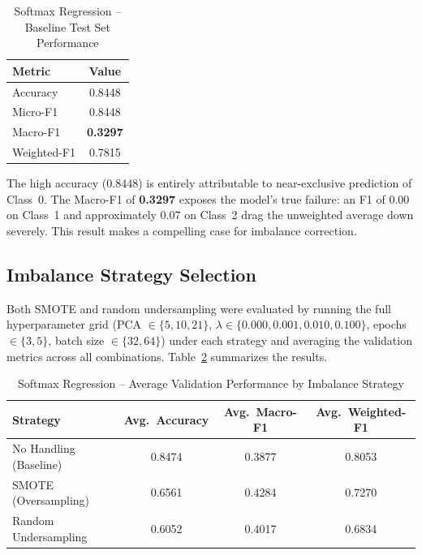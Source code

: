 \documentclass[12pt,a4paper]{article}
\begin{document}
\begin{table}[H]
    \centering
    \caption{Softmax Regression -- Baseline Test Set Performance}
    \label{tab:softmax_baseline_final}
    \begin{tabular}{lc}
        \toprule
        \textbf{Metric} & \textbf{Value} \\
        \midrule
        Accuracy    & 0.8448 \\
        Micro-F1    & 0.8448 \\
        Macro-F1    & \textbf{0.3297} \\
        Weighted-F1 & 0.7815 \\
        \bottomrule
    \end{tabular}
\end{table}

The high accuracy (0.8448) is entirely attributable to near-exclusive prediction of Class~0. The Macro-F1 of \textbf{0.3297} exposes the model's true failure: an F1 of 0.00 on Class~1 and approximately 0.07 on Class~2 drag the unweighted average down severely. This result makes a compelling case for imbalance correction.

\subsection{Imbalance Strategy Selection}

Both SMOTE and random undersampling were evaluated by running the full hyperparameter grid (PCA $\in \{5, 10, 21\}$, $\lambda \in \{0.000, 0.001, 0.010, 0.100\}$, epochs $\in \{3, 5\}$, batch size $\in \{32, 64\}$) under each strategy and averaging the validation metrics across all combinations. Table~\ref{tab:imbalance_compare} summarizes the results.

\begin{table}[H]
    \centering
    \caption{Softmax Regression -- Average Validation Performance by Imbalance Strategy}
    \label{tab:imbalance_compare}
    \begin{tabular}{lccc}
        \toprule
        \textbf{Strategy} & \textbf{Avg.\ Accuracy} & \textbf{Avg.\ Macro-F1} & \textbf{Avg.\ Weighted-F1} \\
        \midrule
        No Handling (Baseline) & 0.8474 & 0.3877 & 0.8053 \\
        SMOTE (Oversampling)   & 0.6561 & 0.4284 & 0.7270 \\
        Random Undersampling   & 0.6052 & 0.4017 & 0.6834 \\
        \bottomrule
    \end{tabular}
\end{table}
\end{document}
